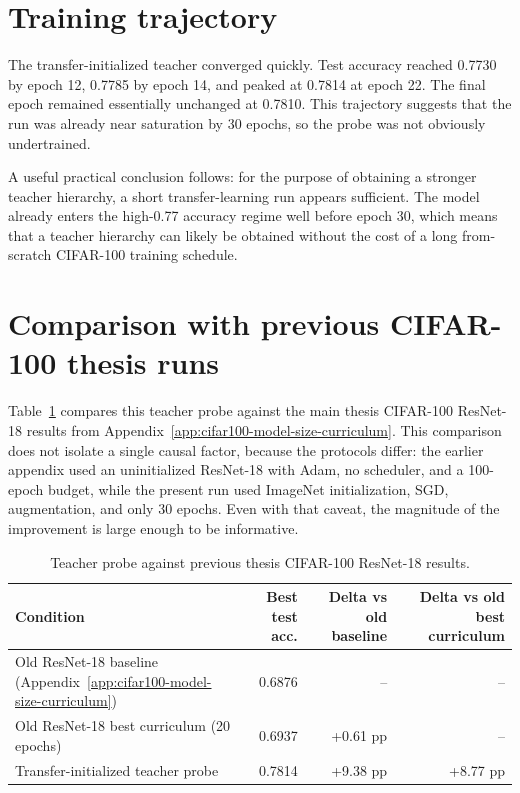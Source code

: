 \section{Training trajectory}

The transfer-initialized teacher converged quickly. Test accuracy reached
0.7730 by epoch 12, 0.7785 by epoch 14, and peaked at 0.7814 at epoch 22. The
final epoch remained essentially unchanged at 0.7810. This trajectory suggests
that the run was already near saturation by 30 epochs, so the probe was not
obviously undertrained.

A useful practical conclusion follows: for the purpose of obtaining a stronger
teacher hierarchy, a short transfer-learning run appears sufficient. The model
already enters the high-0.77 accuracy regime well before epoch 30, which means
that a teacher hierarchy can likely be obtained without the cost of a long
from-scratch CIFAR-100 training schedule.

\section{Comparison with previous CIFAR-100 thesis runs}

Table~\ref{tab:teacher-probe-comparison} compares this teacher probe against the
main thesis CIFAR-100 ResNet-18 results from
Appendix~\ref{app:cifar100-model-size-curriculum}. This comparison does not
isolate a single causal factor, because the protocols differ: the earlier
appendix used an uninitialized ResNet-18 with Adam, no scheduler, and a
100-epoch budget, while the present run used ImageNet initialization, SGD,
augmentation, and only 30 epochs. Even with that caveat, the magnitude of the
improvement is large enough to be informative.

\begin{table}[h]
\centering
\small
\begin{tabular}{lrrr}
\hline
Condition & Best test acc. & Delta vs old baseline & Delta vs old best curriculum \\
\hline
Old ResNet-18 baseline (Appendix~\ref{app:cifar100-model-size-curriculum}) & 0.6876 & -- & -- \\
Old ResNet-18 best curriculum (20 epochs) & 0.6937 & +0.61 pp & -- \\
Transfer-initialized teacher probe & 0.7814 & +9.38 pp & +8.77 pp \\
\hline
\end{tabular}
\caption{Teacher probe against previous thesis CIFAR-100 ResNet-18 results.}
\label{tab:teacher-probe-comparison}
\end{table}


